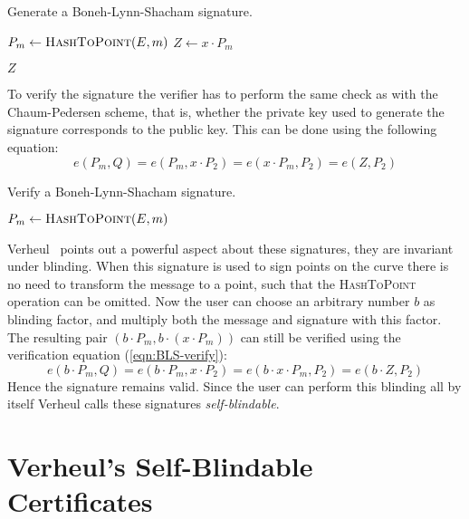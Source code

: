 \begin{algorithm}
  \caption{Generate a Boneh-Lynn-Shacham signature.}
  \label{alg:BLS-sign}
  \addtolength{\baselineskip}{1mm}
  \begin{algorithmic}[1]
      \State $P_m \gets \Call{HashToPoint}{E, m}$
      \State $Z \gets x \cdot P_m$

      \Return $Z$
    \EndFunction
  \end{algorithmic}
\end{algorithm}

To verify the signature the verifier has to perform the same check as with the
Chaum-Pedersen scheme, that is, whether the private key used to generate the
signature corresponds to the public key. This can be done using the following
equation:
\begin{equation}\label{eqn:BLS-verify}
  e(P_m, Q) = e(P_m, x \cdot P_2) = e(x \cdot P_m, P_2) = e(Z, P_2)
\end{equation}

\begin{algorithm}
  \caption{Verify a Boneh-Lynn-Shacham signature.}
  \label{alg:BLS-verify}
  \addtolength{\baselineskip}{1mm}
  \begin{algorithmic}[1]
      \State $P_m \gets \Call{HashToPoint}{E, m}$
      \Return {}
      \EndIf

      \Return {}
    \EndFunction
  \end{algorithmic}
\end{algorithm}

Verheul~\cite{Verheul01} points out a powerful aspect about these signatures,
they are invariant under blinding. When this signature is used to sign points on
the curve there is no need to transform the message to a point, such that the
\textsc{HashToPoint} operation can be omitted. Now the user can choose an
arbitrary number $b$ as blinding factor, and multiply both the message and
signature with this factor. The resulting pair
$(b \cdot P_m, b \cdot (x \cdot P_m))$ can still be verified using the
verification equation (\ref{eqn:BLS-verify}):
$$e(b \cdot P_m, Q) = e(b \cdot P_m, x \cdot P_2) =
e(b \cdot x \cdot P_m, P_2) = e(b \cdot Z, P_2)$$
Hence the signature remains valid. Since the user can perform this blinding all
by itself Verheul calls these signatures \emph{self-blindable}.

\section{Verheul's Self-Blindable Certificates}

